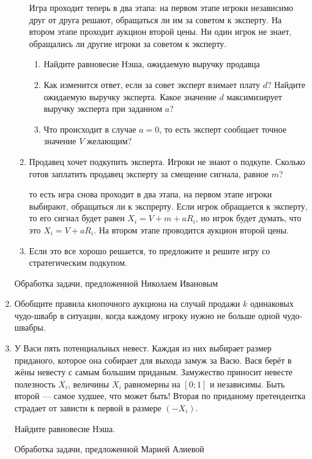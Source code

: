\begin{enumerate}
\begin{enumerate}
Игра проходит теперь в два этапа: на первом этапе игроки независимо друг от друга решают, обращаться ли им за советом к эксперту. На втором этапе проходит аукцион второй цены. Ни один игрок не знает, обращались ли другие игроки за советом к эксперту.

\begin{enumerate}
\item Найдите равновесие Нэша, ожидаемую выручку продавца
\item Как изменится ответ, если за совет эксперт взимает плату $d$? Найдите ожидаемую выручку эксперта. Какое значение $d$ максимизирует выручку эксперта при заданном $a$?
\item Что происходит в случае $a=0$, то есть эксперт сообщает точное значение $V$ желающим?
\end{enumerate}

\item Продавец хочет подкупить эксперта. Игроки не знают о подкупе. Сколько готов заплатить продавец эксперту за смещение сигнала, равное $m$?

то есть игра снова проходит в два этапа, на первом этапе игроки выбирают, обращаться ли к экспрерту. Если игрок обращается к эксперту, то его сигнал будет равен $X_{i}=V+m+aR_{i}$, но игрок будет думать, что это $X_{i}=V+aR_{i}$. На втором этапе проводится аукцион второй цены.

\item Если это все хорошо решается, то предложите и решите игру со стратегическим подкупом.

\end{enumerate}

Обработка задачи, предложенной Николаем Ивановым


\item Обобщите правила кнопочного аукциона на случай продажи $k$ одинаковых чудо-швабр в ситуации, когда каждому игроку нужно не больше одной чудо-швабры.


\item У Васи пять потенциальных невест. Каждая из них выбирает размер приданого, которое она собирает для выхода замуж за Васю. Вася берёт в жёны невесту с самым большим приданым. Замужество приносит невесте полезность $X_{i}$, величины $X_{i}$ равномерны на $[0;1]$ и независимы. Быть второй — самое худшее, что может быть! Вторая по приданому претендентка страдает от зависти к первой в размере $(-X_{i})$.

Найдите равновесие Нэша.


Обработка задачи, предложенной Марией Алиевой


\end{enumerate}
